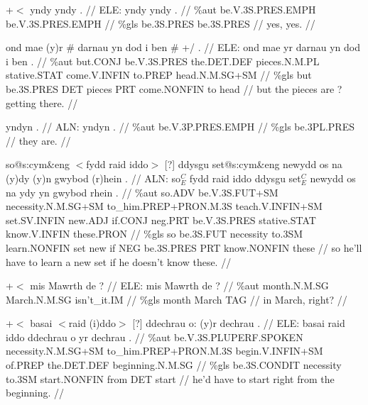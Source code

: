 \documentclass[a4paper,10pt]{article}
\begin{document}
\ex
\begingl[lingstyle=gergl]
\glchat +$<$ yndy yndy . //
\glsurface ELE:  yndy yndy .  //
\glauto \%aut  be{\scriptsize .V.3S.PRES.EMPH} be{\scriptsize .V.3S.PRES.EMPH}   //
\glmanual \%gls  be{\scriptsize .3S.PRES} be{\scriptsize .3S.PRES}   //
\gleng yes, yes. //
\endgl
\xe

\ex
\begingl[lingstyle=gergl]
\glchat ond mae (y)r \# darnau yn dod i ben \# +/ . //
\glsurface ELE:  ond mae yr darnau yn dod i ben .  //
\glauto \%aut  but{\scriptsize .CONJ} be{\scriptsize .V.3S.PRES} the{\scriptsize .DET.DEF} pieces{\scriptsize .N.M.PL} stative{\scriptsize .STAT} come{\scriptsize .V.INFIN} to{\scriptsize .PREP} head{\scriptsize .N.M.SG+SM}   //
\glmanual \%gls  but be{\scriptsize .3S.PRES} DET pieces PRT come{\scriptsize .NONFIN} to head   //
\gleng but the pieces are ?getting there. //
\endgl
\xe

\ex
\begingl[lingstyle=gergl]
\glchat yndyn . //
\glsurface ALN:  yndyn .  //
\glauto \%aut  be{\scriptsize .V.3P.PRES.EMPH}   //
\glmanual \%gls  be{\scriptsize .3PL.PRES}   //
\gleng they are. //
\endgl
\xe

\ex
\begingl[lingstyle=gergl]
\glchat so@s:cym\&eng $<$fydd raid iddo$>$ [?] ddysgu set@s:cym\&eng newydd os na (y)dy (y)n gwybod (r)hein . //
\glsurface ALN:  so$^{C}_{E}$ fydd raid iddo ddysgu set$^{C}_{E}$ newydd os na ydy yn gwybod rhein .  //
\glauto \%aut  so{\scriptsize .ADV} be{\scriptsize .V.3S.FUT+SM} necessity{\scriptsize .N.M.SG+SM} to\_him{\scriptsize .PREP+PRON.M.3S} teach{\scriptsize .V.INFIN+SM} set{\scriptsize .SV.INFIN} new{\scriptsize .ADJ} if{\scriptsize .CONJ} neg{\scriptsize .PRT} be{\scriptsize .V.3S.PRES} stative{\scriptsize .STAT} know{\scriptsize .V.INFIN} these{\scriptsize .PRON}   //
\glmanual \%gls  so be{\scriptsize .3S.FUT} necessity to{\scriptsize .3SM} learn{\scriptsize .NONFIN} set new if NEG be{\scriptsize .3S.PRES} PRT know{\scriptsize .NONFIN} these   //
\gleng so he'll have to learn a new set if he doesn't know these. //
\endgl
\xe

\ex
\begingl[lingstyle=gergl]
\glchat +$<$ mis Mawrth de ? //
\glsurface ELE:  mis Mawrth de ?  //
\glauto \%aut  month{\scriptsize .N.M.SG} March{\scriptsize .N.M.SG} isn't\_it{\scriptsize .IM}   //
\glmanual \%gls  month March TAG   //
\gleng in March, right? //
\endgl
\xe

\ex
\begingl[lingstyle=gergl]
\glchat +$<$ basai $<$raid (i)ddo$>$ [?] ddechrau o: (y)r dechrau . //
\glsurface ELE:  basai raid iddo ddechrau o yr dechrau .  //
\glauto \%aut  be{\scriptsize .V.3S.PLUPERF.SPOKEN} necessity{\scriptsize .N.M.SG+SM} to\_him{\scriptsize .PREP+PRON.M.3S} begin{\scriptsize .V.INFIN+SM} of{\scriptsize .PREP} the{\scriptsize .DET.DEF} beginning{\scriptsize .N.M.SG}   //
\glmanual \%gls  be{\scriptsize .3S.CONDIT} necessity to{\scriptsize .3SM} start{\scriptsize .NONFIN} from DET start   //
\gleng he'd have to start right from the beginning. //
\endgl
\xe
\end{document}
